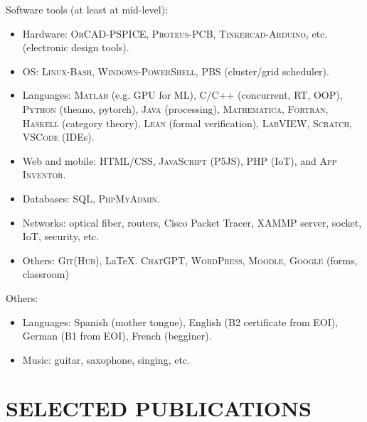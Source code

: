 \documentclass[paper=a4,fontsize=11pt]{scrartcl} %
\newcommand{\NewPart}[1]{\section*{\uppercase{#1}}}
\begin{document}
\noindent Software tools (at least at mid-level):
\begin{itemize} 
 \item Hardware: \textsc{OrCAD-PSPICE, Proteus-PCB, Tinkercad-Arduino}, etc. (electronic design tools). 
 \item OS: \textsc{Linux-Bash, Windows-PowerShell}, \textsc{PBS} (cluster/grid scheduler).
 \item Languages: \textsc{Matlab} (e.g. GPU for ML), \textsc{C/C++} (concurrent, RT, OOP), \textsc{Python} (theano, pytorch), \textsc{Java} (processing),  \textsc{Mathematica}, \textsc{Fortran}, \textsc{Haskell} (category theory), \textsc{Lean} (formal verification), \textsc{LabVIEW, Scratch}, \textsc{VSCode} (IDEs). 
 \item Web and mobile:  \textsc{HTML/CSS, JavaScript (P5JS), PHP} (IoT), and \textsc{App Inventor}.
 \item Databases: \textsc{SQL, PhpMyAdmin}.
 \item Networks: optical fiber, routers, Cisco Packet Tracer, \textsc{XAMMP} server, socket, IoT, security, etc. 
 \item Others: \textsc{Git(Hub)}, \LaTeX. \textsc{ChatGPT, WordPress, Moodle, Google} (forms, classroom)
\end{itemize}

\noindent Others:
\begin{itemize}
 \item Languages: Spanish (mother tongue), English (B2 certificate from EOI), German (B1 from EOI), French (begginer).
 \item Music: guitar, saxophone, singing, etc.
\end{itemize}


\NewPart{Selected publications}{}


\end{document}
